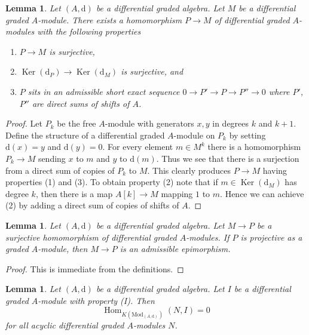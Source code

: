 \documentclass{stacks-project}
\theoremstyle{plain}
\newtheorem{lemma}[subsection]{Lemma}
\theoremstyle{definition}
\theoremstyle{remark}
\numberwithin{equation}{subsection}
\def\Hom{\mathop{\mathrm{Hom}}\nolimits}
\def\Ker{\mathop{\mathrm{Ker}}}
\begin{document}
\begin{lemma}
\label{lemma-good-quotient}
Let $(A, \text{d})$ be a differential graded algebra.
Let $M$ be a differential graded $A$-module. There exists a homomorphism
$P \to M$ of differential graded $A$-modules with the following
properties
\begin{enumerate}
\item $P \to M$ is surjective,
\item $\Ker(\text{d}_P) \to \Ker(\text{d}_M)$ is surjective, and
\item $P$ sits in an admissible short exact sequence
$0 \to P' \to P \to P'' \to 0$ where $P'$, $P''$ are direct sums
of shifts of $A$.
\end{enumerate}
\end{lemma}

\begin{proof}
Let $P_k$ be the free $A$-module with generators $x, y$ in degrees
$k$ and $k + 1$. Define the structure of a differential graded
$A$-module on $P_k$ by setting $\text{d}(x) = y$ and $\text{d}(y) = 0$.
For every element $m \in M^k$ there is a homomorphism
$P_k \to M$ sending $x$ to $m$ and $y$ to $\text{d}(m)$.
Thus we see that there is a surjection from a direct sum
of copies of $P_k$ to $M$. This clearly produces $P \to M$
having properties (1) and (3). To obtain property (2) note
that if $m \in \Ker(\text{d}_M)$ has degree $k$, then there is a map
$A[k] \to M$ mapping $1$ to $m$. Hence we can achieve (2) by adding
a direct sum of copies of shifts of $A$.
\end{proof}

\begin{lemma}
\label{lemma-target-graded-projective}
Let $(A, \text{d})$ be a differential graded algebra.
Let $M \to P$ be a surjective homomorphism of differential graded
$A$-modules. If $P$ is projective as a graded $A$-module, then
$M \to P$ is an admissible epimorphism.
\end{lemma}

\begin{proof}
This is immediate from the definitions.
\end{proof}

\begin{lemma}
\label{lemma-property-I-K-injective}
Let $(A, \text{d})$ be a differential graded algebra.
Let $I$ be a differential graded $A$-module with property (I).
Then
$$
\Hom_{K(\text{Mod}_{(A, \text{d})})}(N, I) = 0
$$
for all acyclic differential graded $A$-modules $N$.
\end{lemma}
\end{document}
